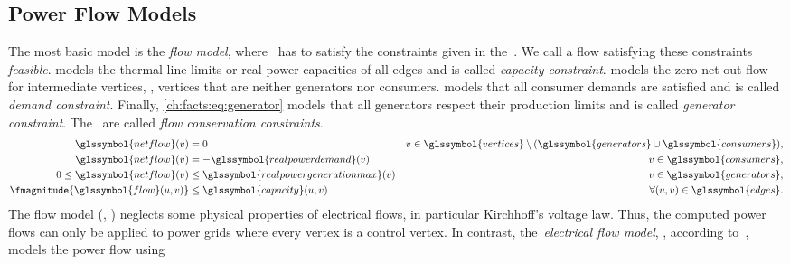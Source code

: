 \subsection{Power Flow Models}%
\label{ch:facts:sec:power-flow-models}%
%
The most basic model is the \emph{flow model}, where~ has to satisfy the
constraints given in
the~.
% 
We call a flow satisfying these constraints \emph{feasible}.
 models the thermal line limits or real power
capacities of all edges and is called \emph{capacity constraint}.
 models the zero net out-flow for intermediate
vertices, \ie, vertices that are neither generators nor consumers.
 models that all consumer demands are satisfied and
is called \emph{demand constraint}. Finally, \cref{ch:facts:eq:generator}
models that all generators respect their production limits and is called
\emph{generator constraint}.
The~ are called
\emph{flow conservation constraints}.
% 
\begin{align}
    \glssymbol{netflow} ( \vertex ) & =  0 & \vertex \in \glssymbol{vertices} \setminus 
    ( \glssymbol{generators} \cup \glssymbol{consumers} ),
    \label{ch:facts:eq:conservation}\\
    \glssymbol{netflow} ( \vertex ) & =   -\glssymbol{realpowerdemand}(\vertex) & \vertex \in
    \glssymbol{consumers},
    \label{ch:facts:eq:consumer}\\
    0 \le \glssymbol{netflow} ( \vertex ) & \le \glssymbol{realpowergenerationmax}(\vertex) & 
    \vertex \in \glssymbol{generators},
    \label{ch:facts:eq:generator}\\
    \fmagnitude{\glssymbol{flow} ( \vertexa, \vertexb )} 
    & 
    \leq 
    \glssymbol{capacity}( \vertexa, \vertexb )
    &  
    \forall (\vertexa, \vertexb) \in \glssymbol{edges}.
    \label{ch:facts:eq:capacity}
\end{align}
% 
The flow model (\ie, )
neglects some physical properties of electrical flows, in particular Kirchhoff's
voltage law.  Thus, the computed power flows can only be applied to power grids
where every vertex is a control vertex.  In contrast, the~\emph{electrical flow
model}, \eg, according to~\textcite{Zimmerman2011a}, models the power flow using
